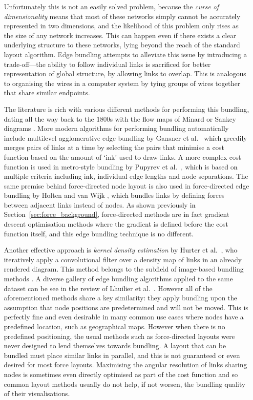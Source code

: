 Unfortunately this is not an easily solved problem, because the \textit{curse of dimensionality} \cite{Friedman2001Local} means that most of these networks simply cannot be accurately represented in two dimensions, and the likelihood of this problem only rises as the size of any network increases. This can happen even if there exists a clear underlying structure to these networks, lying beyond the reach of the standard layout algorithm.
Edge bundling attempts to alleviate this issue by introducing a trade-off---the ability to follow individual links is sacrificed for better representation of global structure, by allowing links to overlap.
This is analogous to organising the wires in a computer system by tying groups of wires together that share similar endpoints.

The literature is rich with various different methods for performing this bundling, dating all the way back to the 1800s with the flow maps of Minard \cite{Minard1862} or Sankey diagrams \cite{Sankey1896}.
More modern algorithms for performing bundling automatically include multilevel agglomerative edge bundling by Gansner et al.\ \cite{Gansner2011} which greedily merges pairs of links at a time by selecting the pairs that minimise a cost function based on the amount of `ink' used to draw links. A more complex cost function is used in metro-style bundling by Pupyrev et al.\ \cite{Pupyrev2016}, which is based on multiple criteria including ink, individual edge lengths and node separations. 
The same premise behind force-directed node layout is also used in force-directed edge bundling by Holten and van Wijk \cite{Holten2009}, which bundles links by defining forces between adjacent links instead of nodes. As shown previously in Section~\ref{sec:force_background}, force-directed methods are in fact gradient descent optimisation methods where the gradient is defined before the cost function itself, and this edge bundling technique is no different.

Another effective approach is \emph{kernel density estimation} by Hurter et al.\ \cite{Hurter2012}, who iteratively apply a convolutional filter over a density map of links in an already rendered diagram. This method belongs to the subfield of image-based bundling methods \cite{Lhuillier2017,Telea2018}. A diverse gallery of edge bundling algorithms applied to the same dataset can be see in the review of Lhuilier et al.\ \cite[Fig.~4]{Lhuillier2017}.
However all of the aforementioned methods share a key similarity: they apply bundling upon the assumption that node positions are predetermined and will not be moved. This is perfectly fine and even desirable in many common use cases where nodes have a predefined location, such as geographical maps. However when there is no predefined positioning, the usual methods such as force-directed layouts were never designed to lend themselves towards bundling. A layout that can be bundled must place similar links in parallel, and this is not guaranteed or even desired for most force layouts. Maximising the angular resolution of links sharing nodes is sometimes even directly optimised as part of the cost function \cite{Argyriou2010} and so common layout methods usually do not help, if not worsen, the bundling quality of their visualisations.

